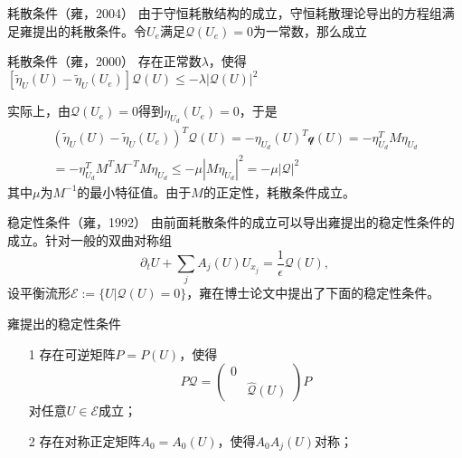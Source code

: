 \documentclass[mathserif]{beamer}
\begin{document}
\begin{frame}{耗散条件（雍，2004）}
\pause
由于守恒耗散结构的成立，守恒耗散理论导出的方程组满足雍提出的耗散条件。令$U_e$满足$\mathcal{Q}(U_e)=0$为一常数，那么成立
\pause%
\begin{block}{耗散条件（雍，2000）}
存在正常数$\lambda$，使得$[\tilde{\eta}_{U}(U) - \tilde{\eta}_{U}(U_e)]\mathcal{Q}(U) \le - \lambda |\mathcal{Q}(U)|^2$
\end{block}
\pause
实际上，由$\mathcal{Q}(U_e)=0$得到$\eta_{U_d}(U_e) = 0$，于是
		\begin{eqnarray*}
			(\tilde{\eta}_{U}(U) - \tilde{\eta}_{U}(U_e))^T \mathcal{Q}(U) = -\eta_{U_d}(U)^T  \mathcal{q}(U) = -\eta_{U_d}^T M \eta_{U_d} \\
			= -\eta_{U_d}^T M^T M^{-T} M \eta_{U_d} \le -\mu |M\eta_{U_d}|^2 = - \mu |\mathcal{Q}|^2 
		\end{eqnarray*}
	其中$\mu$为$M^{-1}$的最小特征值。由于$M$的正定性，耗散条件成立。
\end{frame}

\begin{frame}{稳定性条件（雍，1992）}
由前面耗散条件的成立可以导出雍提出的稳定性条件的成立。针对一般的双曲对称组
\begin{equation*}
	\partial_t U + \sum_j A_j(U) U_{x_j} = \frac{1}{\epsilon} \mathcal{Q}(U),
\end{equation*}
设平衡流形$\mathcal{E}:=\{U|\mathcal{Q}(U)=0\}$，雍在博士论文中提出了下面的稳定性条件。
\begin{block}{雍提出的稳定性条件}
	\begin{enumerate}
		\item[1] 存在可逆矩阵$P=P(U)$，使得
			\begin{equation*}
				P\mathcal{Q} = \left( \begin{matrix}
				0 & \\
				& \hat{\mathcal{Q}}(U) 
				\end{matrix} \right) P
			\end{equation*}
			对任意$U \in \mathcal{E}$成立；
		\item[2] 存在对称正定矩阵$A_0=A_0(U)$，使得$A_0A_j(U)$对称；
	\end{enumerate}
\end{block}
\end{frame}
\end{document}
